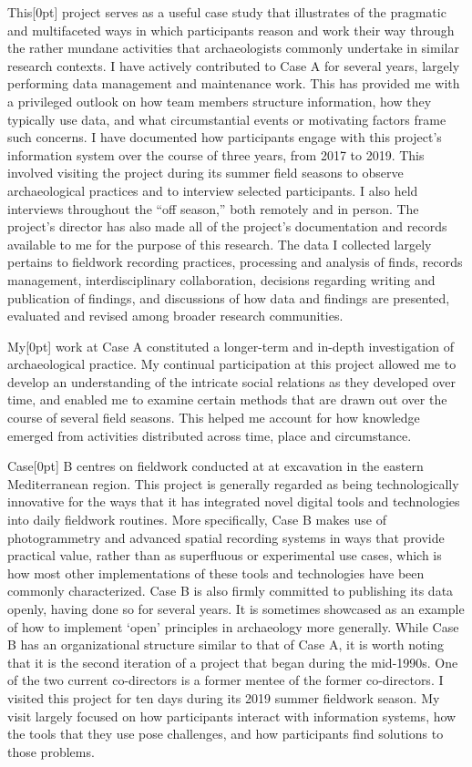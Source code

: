 \documentclass[
]{article}
\newcommand{\paragraphnumber}[1]{\marginnote{\color{lightgray}\tiny{#1}}[0pt]}
\begin{document}
This\paragraphnumber{[86]} project serves as a useful case study that
illustrates of the pragmatic and multifaceted ways in which participants
reason and work their way through the rather mundane activities that
archaeologists commonly undertake in similar research contexts. I have
actively contributed to Case A for several years, largely performing
data management and maintenance work. This has provided me with a
privileged outlook on how team members structure information, how they
typically use data, and what circumstantial events or motivating factors
frame such concerns. I have documented how participants engage with this
project's information system over the course of three years, from 2017
to 2019. This involved visiting the project during its summer field
seasons to observe archaeological practices and to interview selected
participants. I also held interviews throughout the ``off season,'' both
remotely and in person. The project's director has also made all of the
project's documentation and records available to me for the purpose of
this research. The data I collected largely pertains to fieldwork
recording practices, processing and analysis of finds, records
management, interdisciplinary collaboration, decisions regarding writing
and publication of findings, and discussions of how data and findings
are presented, evaluated and revised among broader research communities.

My\paragraphnumber{[87]} work at Case A constituted a longer-term and
in-depth investigation of archaeological practice. My continual
participation at this project allowed me to develop an understanding of
the intricate social relations as they developed over time, and enabled
me to examine certain methods that are drawn out over the course of
several field seasons. This helped me account for how knowledge emerged
from activities distributed across time, place and circumstance.

Case\paragraphnumber{[88]} B centres on fieldwork conducted at at
excavation in the eastern Mediterranean region. This project is
generally regarded as being technologically innovative for the ways that
it has integrated novel digital tools and technologies into daily
fieldwork routines. More specifically, Case B makes use of
photogrammetry and advanced spatial recording systems in ways that
provide practical value, rather than as superfluous or experimental use
cases, which is how most other implementations of these tools and
technologies have been commonly characterized. Case B is also firmly
committed to publishing its data openly, having done so for several
years. It is sometimes showcased as an example of how to implement
`open' principles in archaeology more generally. While Case B has an
organizational structure similar to that of Case A, it is worth noting
that it is the second iteration of a project that began during the
mid-1990s. One of the two current co-directors is a former mentee of the
former co-directors. I visited this project for ten days during its 2019
summer fieldwork season. My visit largely focused on how participants
interact with information systems, how the tools that they use pose
challenges, and how participants find solutions to those problems.
\end{document}
